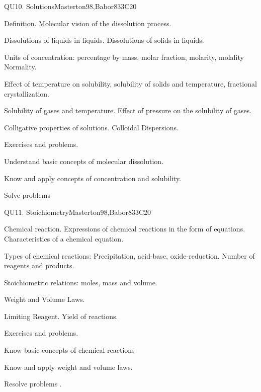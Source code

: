 \begin{syllabus}
\begin{unit}{QU10. Solutions}{}{Masterton98,Babor83}{3}{C20}
\begin{topics}
      \item Definition. Molecular vision of the dissolution process.
      \item Dissolutions of liquids in liquids. Dissolutions of solids in liquids.
      \item Units of concentration: percentage by mass, molar fraction, molarity, molality Normality.
      \item Effect of temperature on solubility, solubility of solids and temperature, fractional crystallization.
      \item Solubility of gases and temperature. Effect of pressure on the solubility of gases.
      \item Colligative properties of solutions. Colloidal Dispersions.
      \item Exercises and problems.
    \end{topics}

   \begin{learningoutcomes}
      \item Understand basic concepts of molecular  dissolution.
      \item Know and apply concepts of concentration and solubility.
      \item Solve problems
   \end{learningoutcomes}
\end{unit}

\begin{unit}{QU11. Stoichiometry}{}{Masterton98,Babor83}{3}{C20} 
\begin{topics}

      \item Chemical reaction. Expressions of chemical reactions in the form of equations. Characteristics of a chemical equation.
      \item Types of chemical reactions: Precipitation, acid-base, oxide-reduction. Number of reagents and products.
      \item Stoichiometric relations: moles, mass and volume.
      \item Weight and Volume Laws.
      \item Limiting Reagent. Yield of reactions.
      \item Exercises and problems.
    \end{topics}

   \begin{learningoutcomes}

      \item Know basic concepts of chemical reactions
      \item Know and apply weight and volume laws.
      \item Resolve problems .
   \end{learningoutcomes}
\end{unit}

\begin{coursebibliography}
\end{coursebibliography}
\end{syllabus}
